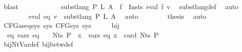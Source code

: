 \begin{isabellebody}
\ blast\isanewline
\ \ \ \ \isamarkupfalse%
\isanewline
\isanewline
\ \ \ \ \isamarkupfalse%
\ \isamarkupfalse%
\ {\isachardoublequoteopen}subst{\isacharunderscore}{\kern0pt}lang\ P\ L\ A\ {\isacharequal}{\kern0pt}\ {\isacharparenleft}{\kern0pt}{\isasymUnion}f\ {\isasymin}\ {\isacharquery}{\kern0pt}Insts{\isachardot}{\kern0pt}\ eval\ f\ v{\isacharparenright}{\kern0pt}{\isachardoublequoteclose}\ \isamarkupfalse%
\ subst{\isacharunderscore}{\kern0pt}lang{\isacharunderscore}{\kern0pt}def\ \isamarkupfalse%
\ auto\isanewline
\ \ \ \ \isamarkupfalse%
\ {\isacharasterisk}{\kern0pt}\ \isamarkupfalse%
\ {\isachardoublequoteopen}eval\ eq\ v\ {\isacharequal}{\kern0pt}\ subst{\isacharunderscore}{\kern0pt}lang\ P\ L\ A{\isachardoublequoteclose}\ \isamarkupfalse%
\ auto\isanewline
\ \ \isamarkupfalse%
\isanewline
\isanewline
\ \ \isamarkupfalse%
\ \isamarkupfalse%
\ {\isacharquery}{\kern0pt}thesis\ \isamarkupfalse%
\ auto\isanewline
{}\isamarkupfalse%
%
\endisatagproof
{\isafoldproof}%
%
\isadelimproof
\isanewline
%
\endisadelimproof
\isanewline
\isanewline
{}\isamarkupfalse%
\ CFG{\isacharunderscore}{\kern0pt}as{\isacharunderscore}{\kern0pt}eq{\isacharunderscore}{\kern0pt}sys{\isacharcolon}{\kern0pt}\ {\isachardoublequoteopen}{\isasymexists}sys{\isachardot}{\kern0pt}\ CFG{\isacharunderscore}{\kern0pt}sys\ sys{\isachardoublequoteclose}\isanewline
%
\isadelimproof
%
\endisadelimproof
%
\isatagproof
{}\isamarkupfalse%
\ {\isacharminus}{\kern0pt}\isanewline
\ \ \isamarkupfalse%
\ bij{\isacharunderscore}{\kern0pt}{\isasymgamma}{\isacharunderscore}{\kern0pt}{\isasymgamma}{\isacharprime}{\kern0pt}\ \isamarkupfalse%
\ {\isacharasterisk}{\kern0pt}{\isacharcolon}{\kern0pt}\ {\isachardoublequoteopen}{\isasymAnd}eq{\isachardot}{\kern0pt}\ vars\ eq\ {\isasymsubseteq}\ {\isasymgamma}{\isacharprime}{\kern0pt}\ {\isacharbackquote}{\kern0pt}\ Nts\ P\ {\isasymLongrightarrow}\ {\isasymforall}x\ {\isasymin}\ vars\ eq{\isachardot}{\kern0pt}\ x\ {\isacharless}{\kern0pt}\ card\ {\isacharparenleft}{\kern0pt}Nts\ P{\isacharparenright}{\kern0pt}{\isachardoublequoteclose}\isanewline
\ \ \ \ \isamarkupfalse%
\ bij{\isacharunderscore}{\kern0pt}Nt{\isacharunderscore}{\kern0pt}Var{\isacharunderscore}{\kern0pt}def\ bij{\isacharunderscore}{\kern0pt}betw{\isacharunderscore}{\kern0pt}def\ \isamarkupfalse%

\end{isabellebody}
